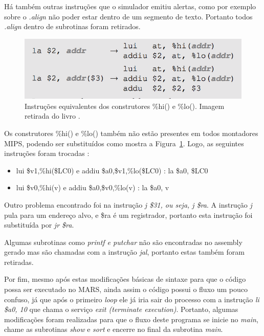 \documentclass[12pt]{article}
\begin{document}
Há também outras instruções que o simulador emitiu alertas, como por exemplo sobre o \textit{.align} não poder estar dentro de um segmento de texto. Portanto todos \textit{.align} dentro de subrotinas foram retirados.

\begin{figure}[H]
	\centering
	\includegraphics[width=1\textwidth]{hilo.png}
	\caption{Instruções equivalentes dos construtores \%hi() e \%lo(). Imagem retirada do livro \cite{mipsrun}.}
	\label{fig:hilo}
\end{figure}

Os construtores \%hi() e \%lo() também não estão presentes em todos montadores MIPS, podendo ser substituídos como mostra a Figura~\ref{fig:hilo}. Logo, as seguintes instruções foram trocadas :

\begin{itemize}
	\item lui \$v1,\%hi(\$LC0) e addiu \$a0,\$v1,\%lo(\$LC0) : la \$a0, \$LC0
    \item lui \$v0,\%hi(v) e addiu \$a0,\$v0,\%lo(v) : la \$a0, v
\end{itemize}

Outro problema encontrado foi na instrução \textit{j \$31, ou seja, j \$ra}. A instrução \textit{j} pula para um endereço alvo, e \$ra é um registrador, portanto esta instrução foi substituída por \textit{jr \$ra}.

Algumas subrotinas como \textit{printf e putchar} não são encontradas no assembly gerado mas são chamadas com a instrução \textit{jal}, portanto estas também foram retiradas.

Por fim, mesmo após estas modificações básicas de sintaxe para que o código possa ser executado no MARS, ainda assim o código possui o fluxo um pouco confuso, já que após o primeiro \textit{loop} ele já iria sair do processo com a instrução \textit{li \$a0, 10} que chama o serviço \textit{exit (terminate execution)}. Portanto, algumas modificações foram realizadas para que o fluxo deste programa se inicie no \textit{main}, chame as subrotinas \textit{show} e \textit{sort} e encerre no final da subrotina \textit{main}.
\end{document}
